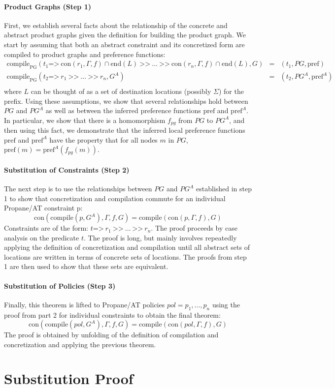 \documentclass[twocolumn, openany]{sig-alternate-10pt}
\newcommand{\sysname}{{\small \sf Propane/AT}\xspace}
\newcommand{\para}[1]{\paragraph*{\textbf{#1}}}
\newcommand{\Prefer}{\texttt{>>}}
\newcommand{\Path}{\texttt{=>}}
\newcommand{\Con}{\mathrm{con}}
\newcommand{\CompilePg}{\ensuremath{\mathrm{compile}_\mathrm{PG}}}
\newcommand{\Compile}{\ensuremath{\mathrm{compile}}}
\newcommand{\Pref}{\ensuremath{\mathrm{pref}}}
\newcommand{\EndR}{\ensuremath{\mathrm{end}}}
\begin{document}
\para{Product Graphs (Step 1)} First, we establish several facts about the relationship of the concrete and abstract product graphs given the definition for building the product graph. We start by assuming that both an abstract constraint and its concretized form are compiled to product graphs and preference functions: 
%
\[
\begin{array}{lll}
  \CompilePg(t_1 \Path~ \Con(r_1,\Gamma,f) \cap \EndR(L) ~\Prefer~ \ldots ~\Prefer~ \Con(r_n,\Gamma,f) \cap \EndR(L), G) &=& (t_1, PG, \Pref) \\
  \CompilePg(t_2 \Path~ r_1 ~\Prefer~ \ldots ~\Prefer~ r_n, G^A) &=& (t_2, PG^A, \Pref^A) \\
\end{array}
\]
%
where $L$ can be thought of as a set of destination locations (possibly $\Sigma$) for the prefix. Using these assumptions, we show that several relationships hold between $PG$ and $PG^A$ as well as between the inferred preference functions $\Pref$ and $\Pref^A$. In particular, we show that there is a homomorphism $f_{pg}$ from $PG$ to $PG^A$, and then using this fact, we demonstrate that the inferred local preference functions $\Pref$ and $\Pref^A$ have the property that for all nodes $m$ in $PG$,  $\Pref(m) = \Pref^A(f_{pg}(m))$.

\para{Substitution of Constraints (Step 2)} 
The next step is to use the relationships between $PG$ and $PG^A$ established in step 1 to show that concretization and compilation commute for an individual \sysname constraint p:
%
$$\Con(\Compile(p, G^A), \Gamma, f, G) = \Compile(\Con(p,\Gamma,f), G)$$
%
Constraints are of the form: $t \Path~ r_1 ~\Prefer~ \ldots ~\Prefer~ r_n$. The proof proceeds by case analysis on the predicate $t$. The proof is long, but mainly involves repeatedly applying the definition of concretization and compilation until all abstract sets of locations are written in terms of concrete sets of locations. The proofs from step 1 are then used to show that these sets are equivalent.

\para{Substitution of Policies (Step 3)} Finally, this theorem is lifted to \sysname policies $pol = p_1, \ldots, p_n$ using the proof from part 2 for individual constraints to obtain the final theorem:
%
$$\Con(\Compile(pol,G^A),\Gamma,f,G) = \Compile(\Con(pol,\Gamma,f), G)$$ 
%
The proof is obtained by unfolding of the definition of compilation and concretization and applying the previous theorem.

\newpage


\section{Substitution Proof}
\end{document}
